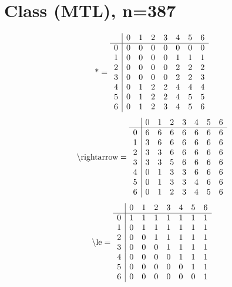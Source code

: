 \documentclass[11pt]{article}
\begin{document}
\section{Class (MTL), n=387}
\[\text{*} = 
\begin{array}{r | r r r r r r r}
 & 0 & 1 & 2 & 3 & 4 & 5 & 6 \\ \hline
0 & 0 & 0 & 0 & 0 & 0 & 0 & 0 \\
1 & 0 & 0 & 0 & 0 & 1 & 1 & 1 \\
2 & 0 & 0 & 0 & 0 & 2 & 2 & 2 \\
3 & 0 & 0 & 0 & 0 & 2 & 2 & 3 \\
4 & 0 & 1 & 2 & 2 & 4 & 4 & 4 \\
5 & 0 & 1 & 2 & 2 & 4 & 5 & 5 \\
6 & 0 & 1 & 2 & 3 & 4 & 5 & 6 \\
\end{array}
\]
\[\text{\textbackslash rightarrow} = 
\begin{array}{r | r r r r r r r}
 & 0 & 1 & 2 & 3 & 4 & 5 & 6 \\ \hline
0 & 6 & 6 & 6 & 6 & 6 & 6 & 6 \\
1 & 3 & 6 & 6 & 6 & 6 & 6 & 6 \\
2 & 3 & 3 & 6 & 6 & 6 & 6 & 6 \\
3 & 3 & 3 & 5 & 6 & 6 & 6 & 6 \\
4 & 0 & 1 & 3 & 3 & 6 & 6 & 6 \\
5 & 0 & 1 & 3 & 3 & 4 & 6 & 6 \\
6 & 0 & 1 & 2 & 3 & 4 & 5 & 6 \\
\end{array}
\]
\[\text{\textbackslash le} = 
\begin{array}{r | r r r r r r r}
 & 0 & 1 & 2 & 3 & 4 & 5 & 6 \\ \hline
0 & 1 & 1 & 1 & 1 & 1 & 1 & 1 \\
1 & 0 & 1 & 1 & 1 & 1 & 1 & 1 \\
2 & 0 & 0 & 1 & 1 & 1 & 1 & 1 \\
3 & 0 & 0 & 0 & 1 & 1 & 1 & 1 \\
4 & 0 & 0 & 0 & 0 & 1 & 1 & 1 \\
5 & 0 & 0 & 0 & 0 & 0 & 1 & 1 \\
6 & 0 & 0 & 0 & 0 & 0 & 0 & 1 \\
\end{array}
\]
\end{document}
